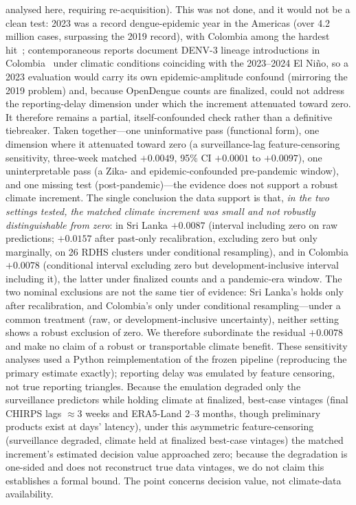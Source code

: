 \documentclass[11pt,a4paper]{article}
\begin{document}
analysed here, requiring re-acquisition). This was not done, and it would not be a clean test: 2023 was a record dengue-epidemic year in the Americas (over 4.2 million cases, surpassing the 2019 record), with Colombia among the hardest hit~\cite{PAHO2023}; contemporaneous reports document DENV-3 lineage introductions in Colombia~\cite{ValleDelCauca2024} under climatic conditions coinciding with the 2023--2024 El Ni\~no, so a 2023 evaluation would carry its own epidemic-amplitude confound (mirroring the 2019 problem) and, because OpenDengue counts are finalized, could not address the reporting-delay dimension under which the increment attenuated toward zero. It therefore remains a partial, itself-confounded check rather than a definitive tiebreaker. Taken together---one uninformative pass (functional form), one dimension where it attenuated toward zero (a surveillance-lag feature-censoring sensitivity, three-week matched $+0.0049$, 95\% CI $+0.0001$ to $+0.0097$), one uninterpretable pass (a Zika- and epidemic-confounded pre-pandemic window), and one missing test (post-pandemic)---the evidence does not support a robust climate increment. The single conclusion the data support is that, \emph{in the two settings tested, the matched climate increment was small and not robustly distinguishable from zero}: in Sri Lanka $+0.0087$ (interval including zero on raw predictions; $+0.0157$ after past-only recalibration, excluding zero but only marginally, on 26 RDHS clusters under conditional resampling), and in Colombia $+0.0078$ (conditional interval excluding zero but development-inclusive interval including it), the latter under finalized counts and a pandemic-era window. The two nominal exclusions are not the same tier of evidence: Sri Lanka's holds only after recalibration, and Colombia's only under conditional resampling---under a common treatment (raw, or development-inclusive uncertainty), neither setting shows a robust exclusion of zero. We therefore subordinate the residual $+0.0078$ and make no claim of a robust or transportable climate benefit. These sensitivity analyses used a Python reimplementation of the frozen pipeline (reproducing the primary estimate exactly); reporting delay was emulated by feature censoring, not true reporting triangles. Because the emulation degraded only the surveillance predictors while holding climate at finalized, best-case vintages (final CHIRPS lags $\approx$3 weeks and ERA5-Land 2--3 months, though preliminary products exist at days' latency), under this asymmetric feature-censoring (surveillance degraded, climate held at finalized best-case vintages) the matched increment's estimated decision value approached zero; because the degradation is one-sided and does not reconstruct true data vintages, we do not claim this establishes a formal bound. The point concerns decision value, not climate-data availability.
\end{document}
